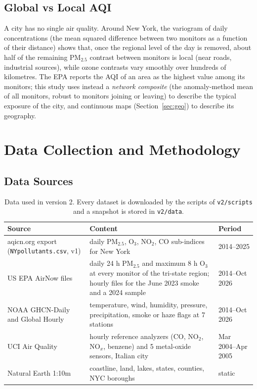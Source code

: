 \documentclass[11pt]{article}
\begin{document}
\subsection{Global vs Local AQI}

A city has no single air quality. Around New York, the variogram of daily concentrations (the mean squared difference between two monitors as a function of their distance) shows that, once the regional level of the day is removed, about half of the remaining PM$_{2.5}$ contrast between monitors is local (near roads, industrial sources), while ozone contrasts vary smoothly over hundreds of kilometres. The EPA reports the AQI of an area as the highest value among its monitors; this study uses instead a \emph{network composite} (the anomaly-method mean of all monitors, robust to monitors joining or leaving) to describe the typical exposure of the city, and continuous maps (Section~\ref{sec:geo}) to describe its geography.

\section{Data Collection and Methodology}

\subsection{Data Sources}

\begin{table}[H]
\centering\small
\begin{tabularx}{\textwidth}{>{\raggedright\arraybackslash}p{4.3cm}>{\raggedright\arraybackslash}Xl}
\toprule
Source & Content & Period\\
\midrule
aqicn.org export (\texttt{NYpollutants.csv}, v1) \citep{aqicn} & daily PM$_{2.5}$, O$_3$, NO$_2$, CO sub-indices for New York & 2014--2025\\
US EPA AirNow files \citep{airnowfiles} & daily 24 h PM$_{2.5}$ and maximum 8 h O$_3$ at every monitor of the tri-state region; hourly files for the June 2023 smoke and a 2024 sample & 2014--Oct 2026\\
NOAA GHCN-Daily and Global Hourly \citep{ghcnd} & temperature, wind, humidity, pressure, precipitation, smoke or haze flags at 7 stations & 2014--Oct 2026\\
UCI Air Quality \citep{devito2008} & hourly reference analyzers (CO, NO$_2$, NO$_x$, benzene) and 5 metal-oxide sensors, Italian city & Mar 2004--Apr 2005\\
Natural Earth 1:10m & coastline, land, lakes, states, counties, NYC boroughs & static\\
\bottomrule
\end{tabularx}
\caption{Data used in version 2. Every dataset is downloaded by the scripts of \texttt{v2/scripts} and a snapshot is stored in \texttt{v2/data}.}
\end{table}
\end{document}
